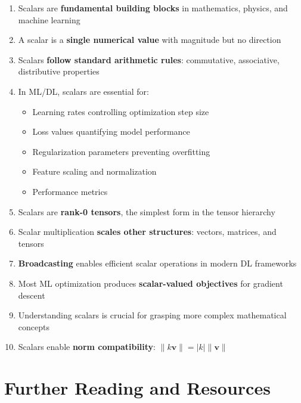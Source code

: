 \documentclass[11pt,a4paper]{article}
\begin{document}
\begin{enumerate}
    \item Scalars are \textbf{fundamental building blocks} in mathematics, physics, and machine learning
    
    \item A scalar is a \textbf{single numerical value} with magnitude but no direction
    
    \item Scalars \textbf{follow standard arithmetic rules}: commutative, associative, distributive properties
    
    \item In ML/DL, scalars are essential for:
    \begin{itemize}
        \item Learning rates controlling optimization step size
        \item Loss values quantifying model performance
        \item Regularization parameters preventing overfitting
        \item Feature scaling and normalization
        \item Performance metrics
    \end{itemize}
    
    \item Scalars are \textbf{rank-0 tensors}, the simplest form in the tensor hierarchy
    
    \item Scalar multiplication \textbf{scales other structures}: vectors, matrices, and tensors
    
    \item \textbf{Broadcasting} enables efficient scalar operations in modern DL frameworks
    
    \item Most ML optimization produces \textbf{scalar-valued objectives} for gradient descent
    
    \item Understanding scalars is crucial for grasping more complex mathematical concepts
    
    \item Scalars enable \textbf{norm compatibility}: $\|k\mathbf{v}\| = |k|\|\mathbf{v}\|$
\end{enumerate}

\section{Further Reading and Resources}
\end{document}
